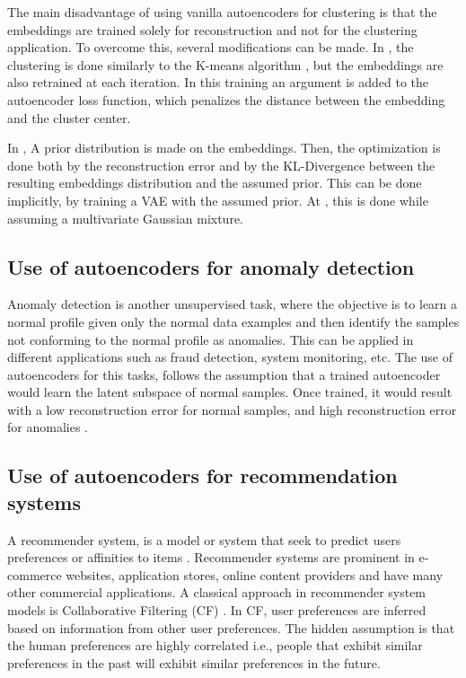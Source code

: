 \documentclass[graybox]{svmult}
\begin{document}
The main disadvantage of using vanilla autoencoders for clustering is that the embeddings are trained solely for reconstruction and not for the clustering application. To overcome this, several modifications can be made.
In \cite{Auto-encoder_Based_Data_Clustering}, the clustering is done similarly to the K-means algorithm \cite{kmeans}, but the embeddings are also retrained at each iteration. In this training an argument is added to the autoencoder loss function, which penalizes the distance between the embedding and the cluster center.

In \cite{soft_clustering}, A prior distribution is made on the embeddings. Then, the optimization is done both by the reconstruction error and by the KL-Divergence between the resulting embeddings distribution and the assumed prior.
This can be done implicitly, by training a VAE with the assumed prior. At \cite{autoencoder_gmm}, this is done while assuming a multivariate Gaussian mixture.


\subsection{Use of autoencoders for anomaly detection}
Anomaly detection is another unsupervised task, where the objective is to learn a normal profile given only the normal data examples and then identify the samples not conforming to the normal profile as anomalies.
This can be applied in different applications such as fraud detection, system monitoring, etc.
The use of autoencoders for this tasks, follows the assumption that a trained autoencoder would learn the latent subspace of normal samples. Once trained, it would result with a low reconstruction error for normal samples, and high reconstruction error for anomalies \cite{anomaly_detection1, anomaly_detection2, anomaly_detection3, anomaly_detection4}. 

\subsection{Use of autoencoders for recommendation systems}
A recommender system, is a model or system that seek to predict users preferences or affinities to items \cite{recsys_book}. Recommender systems are prominent in e-commerce websites, application stores, online content providers and have many other commercial applications.
A classical approach in recommender system models is Collaborative Filtering (CF) \cite{CF_Explained}. In CF, user preferences are inferred based on information from other user preferences. The hidden assumption is that the human preferences are highly correlated i.e., people that exhibit similar preferences in the past will exhibit similar preferences in the future. 
\end{document}
